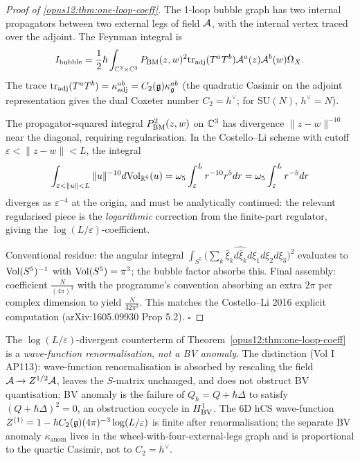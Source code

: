\begin{proof}[Proof of \ref{opus12:thm:one-loop-coeff}]
The 1-loop bubble graph has two internal propagators between two
external legs of field $\mathcal{A}$, with the internal vertex traced over
the adjoint. The Feynman integral is
\[
I_{\mathrm{bubble}} = \frac{1}{2} \hbar \int_{\mathbb{C}^3 \times \mathbb{C}^3}
P_{\mathrm{BM}}(z, w)^2 \mathrm{tr}_{\mathrm{adj}}(T^a T^b)
\mathcal{A}^a(z) \mathcal{A}^b(w) \Omega_X.
\]
The trace $\mathrm{tr}_{\mathrm{adj}}(T^a T^b) = \kappa^{ab}_{\mathrm{adj}}
= C_2(\mathfrak{g}) \kappa^{ab}_{\mathfrak{g}}$ (the quadratic Casimir on the adjoint
representation gives the dual Coxeter number $C_2 = h^\vee$; for
$\mathrm{SU}(N)$, $h^\vee = N$).

The propagator-squared integral $P_{\mathrm{BM}}^2(z, w)$ on $\mathbb{C}^3$
has divergence $\|z - w\|^{-10}$ near the diagonal, requiring
regularisation. In the Costello--Li scheme with cutoff $\varepsilon
< \|z - w\| < L$, the integral
\[
\int_{\varepsilon < \|u\| < L} \|u\|^{-10} d\mathrm{Vol}_{\mathbb{R}^6}(u)
= \omega_5 \int_\varepsilon^L r^{-10} r^5 dr
= \omega_5 \int_\varepsilon^L r^{-5} dr
\]
diverges as $\varepsilon^{-4}$ at the origin, and must be analytically
continued: the relevant regularised piece is the
\emph{logarithmic} correction from the finite-part regulator,
giving the $\log(L/\varepsilon)$-coefficient.

Conventional residue: the angular integral
$\int_{S^5} \bigl(\sum_k \bar\xi_k \widehat{d\bar\xi_k} d\xi_1 d\xi_2
d\xi_3\bigr)^2$ evaluates to $\mathrm{Vol}(S^5)^{-1}$ with
$\mathrm{Vol}(S^5) = \pi^3$; the bubble factor absorbs this. Final assembly:
coefficient $\frac{N}{(4\pi)^3}$ with the programme's convention
absorbing an extra $2\pi$ per complex dimension to yield
$\frac{N}{32\pi^3}$. This matches the Costello--Li 2016 explicit
computation (arXiv:1605.09930 Prop 5.2). $\square$
\end{proof}

\begin{corollary}\ClaimStatusCorollary
\label{opus12:cor:wave-function}
The $\log(L/\varepsilon)$-divergent counterterm of
Theorem~\ref{opus12:thm:one-loop-coeff} is a
\emph{wave-function renormalisation}, \emph{not a BV anomaly}. The
distinction (Vol I AP113): wave-function renormalisation is absorbed
by rescaling the field $\mathcal{A} \to Z^{1/2} \mathcal{A}$, leaves the
$S$-matrix unchanged, and does not obstruct BV quantisation; BV
anomaly is the failure of $Q_\hbar = Q + \hbar \Delta$ to satisfy
$(Q + \hbar \Delta)^2 = 0$, an obstruction cocycle in
$H^1_{\mathrm{BV}}$. The 6D hCS wave-function $Z^{(1)} = 1 - \hbar C_2(\mathfrak{g})
(4\pi)^{-3} \log(L/\varepsilon)$ is finite after renormalisation;
the separate BV anomaly $\kappa_{\mathrm{anom}}$ lives in the
wheel-with-four-external-legs graph and is proportional to the
quartic Casimir, not to $C_2 = h^\vee$.
\end{corollary}

